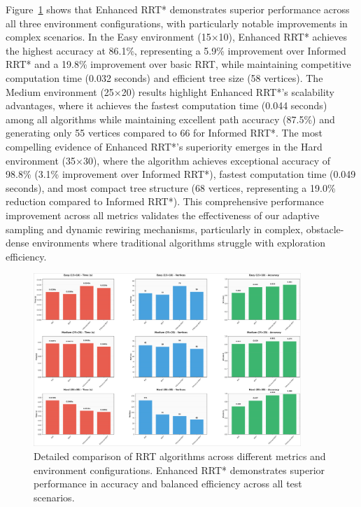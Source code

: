 \documentclass[pdflatex,sn-mathphys-num]{sn-jnl}
\theoremstyle{thmstyleone}%
\theoremstyle{thmstyletwo}%
\theoremstyle{thmstylethree}%
\begin{document}
Figure~\ref{fig:detailed_comparison} shows that Enhanced RRT* demonstrates superior performance across all three environment configurations, with particularly notable improvements in complex scenarios. In the Easy environment (15×10), Enhanced RRT* achieves the highest accuracy at 86.1\%, representing a 5.9\% improvement over Informed RRT* and a 19.8\% improvement over basic RRT, while maintaining competitive computation time (0.032 seconds) and efficient tree size (58 vertices). The Medium environment (25×20) results highlight Enhanced RRT*'s scalability advantages, where it achieves the fastest computation time (0.044 seconds) among all algorithms while maintaining excellent path accuracy (87.5\%) and generating only 55 vertices compared to 66 for Informed RRT*. The most compelling evidence of Enhanced RRT*'s superiority emerges in the Hard environment (35×30), where the algorithm achieves exceptional accuracy of 98.8\% (3.1\% improvement over Informed RRT*), fastest computation time (0.049 seconds), and most compact tree structure (68 vertices, representing a 19.0\% reduction compared to Informed RRT*). This comprehensive performance improvement across all metrics validates the effectiveness of our adaptive sampling and dynamic rewiring mechanisms, particularly in complex, obstacle-dense environments where traditional algorithms struggle with exploration efficiency.

\begin{figure}[htbp]
\centering
\includegraphics[width=0.9\textwidth]{comparison.png}
\caption{Detailed comparison of RRT algorithms across different metrics and environment configurations. Enhanced RRT* demonstrates superior performance in accuracy and balanced efficiency across all test scenarios.}
\label{fig:detailed_comparison}
\end{figure}
\end{document}
